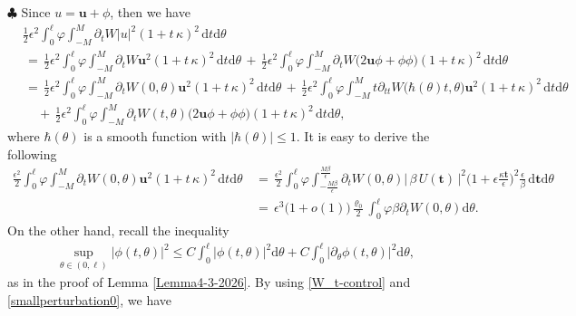\documentclass[10pt, reqno]{amsart}
\numberwithin{equation}{section}
\theoremstyle{definition}
\def\p{\partial}
\begin{document}
{{\smallskip
\noindent$\clubsuit$
Since $u={\mathbf u}+\phi$, then we have
\begin{align*}
 &\frac{1}{2}\epsilon^2\int_0^\ell \varphi \int_{-M}^{M} \partial_t W |u|^2
 (1+t\,\kappa)^2\,{\mathrm d}t{\mathrm d}\theta
\nonumber\\[2mm]
 &\,=\,
 \frac{1}{2}\epsilon^2\int_0^\ell \varphi \int_{-M}^{M}
 \partial_t W {\mathbf u}^2
 (1+t\,\kappa)^2\,{\mathrm d}t{\mathrm d}\theta
 \,+\,
 \frac{1}{2}\epsilon^2\int_0^\ell \varphi \int_{-M}^{M}
 \partial_t W\big(2{\mathbf u}\phi+\phi\phi\big)
 (1+t\,\kappa)^2\,{\mathrm d}t{\mathrm d}\theta
\nonumber\\[2mm]
 &\,=\,
 \frac{1}{2}\epsilon^2\int_0^\ell \varphi \int_{-M}^{M}
 \partial_t W(0, \theta) {\mathbf u}^2
 (1+t\,\kappa)^2\,{\mathrm d}t{\mathrm d}\theta
 \,+\,
 \frac{1}{2}\epsilon^2\int_0^\ell \varphi \int_{-M}^{M}
 t\partial_{tt} W\big(\hbar(\theta)t,\theta\big) {\mathbf u}^2
 (1+t\,\kappa)^2\,{\mathrm d}t{\mathrm d}\theta
\nonumber\\[2mm]
 &\quad
 \,+\,
 \frac{1}{2}\epsilon^2\int_0^\ell \varphi \int_{-M}^{M}
 \partial_t W(t, \theta)
 \big(2{\mathbf u}\phi+\phi\phi\big)
 (1+t\,\kappa)^2\,{\mathrm d}t{\mathrm d}\theta,
\end{align*}
 where $\hbar(\theta)$ is a smooth function with $|\hbar(\theta)|\leq 1$.
 It is easy to derive the following
\begin{align*}
\frac{\epsilon^2}{2}\int_0^\ell \varphi \int_{-M}^{M}
 \partial_t W(0, \theta){\mathbf u}^2
 (1+t\,\kappa)^2\,{\mathrm d}t{\mathrm d}\theta
 &\,=\,
 \frac{\epsilon^2}{2}\int_0^\ell \varphi \int_{-\frac{M\beta}{\epsilon}}^{ \frac{M\beta}{\epsilon}}
 \partial_t W(0, \theta)
 \big|\,\beta\, U({\mathbf t})\, \big|^2\Big(1+\epsilon \frac{\kappa {\mathbf t}}{\epsilon}\Big)^2
 \frac{\epsilon}{\beta}
 \,{\mathrm d}{\mathbf t}{\mathrm d}\theta
\nonumber\\[2mm]
 & \,=\,
 \epsilon^3\big(1+o(1)\big)\frac{\varrho_0}{2}
 \int_0^\ell \varphi \beta
 \partial_t W(0, \theta){\mathrm d}\theta.
\end{align*}
 On the other hand,  recall the inequality
\begin{align*}
 \sup_{\theta \in (0,  \ell) }  |\phi (t, \theta)|^2 \le C \int_0^{\ell} |\phi (t, \theta)|^2 {\mathrm d} \theta + C  \int_0^{\ell} |\p_\theta\phi (t, \theta)|^2 {\mathrm d} \theta,
\end{align*}
as in the proof of Lemma \ref{Lemma4-3-2026}.
By using \eqref{W_t-control} and \eqref{smallperturbation0}, we have
\begin{align}

\end{align}}}
\end{document}

